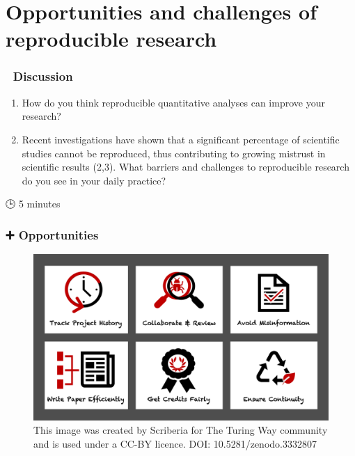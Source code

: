 \documentclass[
  letterpaper,
  DIV=11,
  numbers=noendperiod]{scrreprt}
\providecommand{\tightlist}{%
  \setlength{\itemsep}{0pt}\setlength{\parskip}{0pt}}\usepackage{longtable,booktabs,array}
\begin{document}
\hypertarget{opportunities-and-challenges-of-reproducible-research}{%
\section{Opportunities and challenges of reproducible
research}\label{opportunities-and-challenges-of-reproducible-research}}

\hypertarget{discussion}{%
\subsubsection{\texorpdfstring{{💬}
Discussion}{💬 Discussion}}\label{discussion}}

\begin{enumerate}
\def\labelenumi{\arabic{enumi}.}
\tightlist
\item
  How do you think reproducible quantitative analyses can improve your
  research?
\item
  Recent investigations have shown that a significant percentage of
  scientific studies cannot be reproduced, thus contributing to growing
  mistrust in scientific results (2,3). What barriers and challenges to
  reproducible research do you see in your daily practice?
\end{enumerate}

{🕒} 5 minutes

\hypertarget{opportunities}{%
\subsubsection{\texorpdfstring{{➕}
Opportunities}{➕ Opportunities}}\label{opportunities}}

\begin{figure}

{\centering \includegraphics{./images/paste-9DF4B400.png}

}

\caption{This image was created by Scriberia for The Turing Way
community and is used under a CC-BY licence. DOI:
10.5281/zenodo.3332807}

\end{figure}
\end{document}
